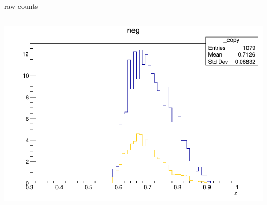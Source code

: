 \begin{frame}{raw counts}
\begin{columns}
\begin{column}[T]{0.25\textwidth}
\includegraphics[width = \textwidth]{results/yield/statistics/yield_x_Q2_z_0.40_4.000_0.70_neg.png}
\end{column}
\end{columns}
\end{frame}
